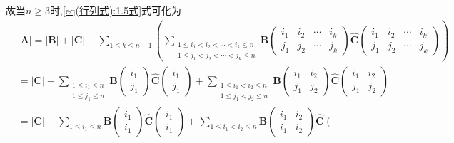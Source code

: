 \documentclass[lang=cn,newtx,10pt,scheme=chinese]{elegantbook}
\begin{document}
\begin{solution}
故当\(n\geqslant 3\)时,\eqref{eq(行列式):1.5式}式可化为
\begin{align*}
&|\boldsymbol{A}| = |\boldsymbol{B}| + |\boldsymbol{C}| + \sum_{1\leqslant k\leqslant n - 1}\left(\sum_{\substack{
1\leqslant i_1 < i_2 < \cdots < i_k\leqslant n\\
1\leqslant j_1 < j_2 < \cdots < j_k\leqslant n
}}\boldsymbol{B}\left(\begin{matrix}
i_1 & i_2 & \cdots & i_k\\
j_1 & j_2 & \cdots & j_k
\end{matrix}\right)\widehat{\boldsymbol{C}}\left(\begin{matrix}
i_1 & i_2 & \cdots & i_k\\
j_1 & j_2 & \cdots & j_k
\end{matrix}\right)\right) 
\\
&= |\boldsymbol{C}| + \sum_{\substack{
1\leqslant i_1\leqslant n\\
1\leqslant j_1\leqslant n
}}\boldsymbol{B}\left(\substack{
i_1\\
j_1
}\right)\widehat{\boldsymbol{C}}\left(\begin{array}{c}
i_1\\
j_1
\end{array}\right) + \sum_{\substack{
1\leqslant i_1 < i_2\leqslant n\\
1\leqslant j_1 < j_2\leqslant n
}}\boldsymbol{B}\left(\begin{matrix}
i_1 & i_2\\
j_1 & j_2
\end{matrix}\right)\widehat{\boldsymbol{C}}\left(\begin{matrix}
i_1 & i_2\\
j_1 & j_2
\end{matrix}\right)
\\
&= |\boldsymbol{C}| + \sum_{1\leqslant i_1\leqslant n}\boldsymbol{B}\left(\begin{array}{c}
i_1\\
i_1
\end{array}\right)\widehat{\boldsymbol{C}}\left(\begin{array}{c}
i_1\\
i_1
\end{array}\right) + \sum_{1\leqslant i_1 < i_2\leqslant n}\boldsymbol{B}\left(\begin{matrix}
i_1 & i_2\\
i_1 & i_2
\end{matrix}\right)\widehat{\boldsymbol{C}}\left(\begin{matrix}

\end{matrix}
\end{align*}
\end{solution}
\end{document}
